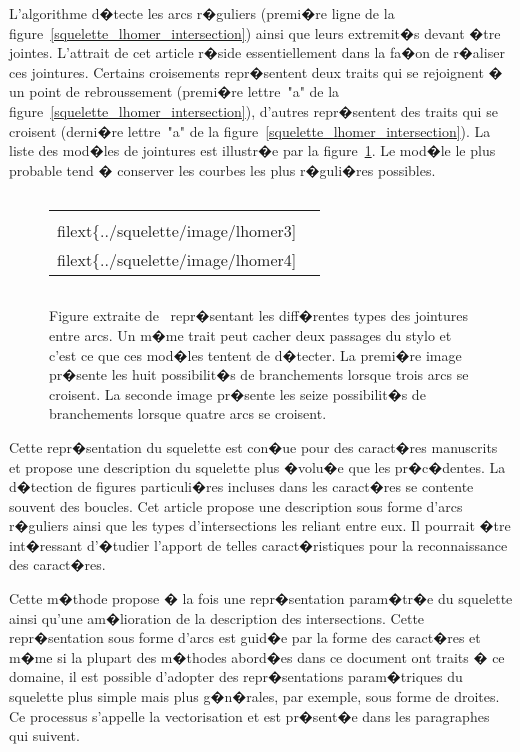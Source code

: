 
L'algorithme d�tecte les arcs r�guliers (premi�re ligne de la figure~\ref{squelette_lhomer_intersection}) ainsi que leurs extremit�s devant �tre jointes. L'attrait de cet article r�side essentiellement dans la fa�on de r�aliser ces jointures. Certains croisements repr�sentent deux traits qui se rejoignent � un point de rebroussement (premi�re lettre~"a" de la figure~\ref{squelette_lhomer_intersection}), d'autres repr�sentent des traits qui se croisent (derni�re lettre~"a" de la figure~\ref{squelette_lhomer_intersection}). La liste des mod�les de jointures est illustr�e par la figure~\ref{squelette_lhomer_intersection_modele}. Le mod�le le plus probable tend � conserver les courbes les plus r�guli�res possibles.


            \begin{figure}[ht]
        $$\begin{tabular}{|c|c|} \hline
        \texttt{[image: \\filext\{../squelette/image/lhomer3]}} &
        \texttt{[image: \\filext\{../squelette/image/lhomer4]}} 
        \\ \hline \end{tabular}$$
        \caption{    Figure extraite de~ repr�sentant les diff�rentes 
                            types des jointures entre arcs.
                            Un m�me trait peut cacher deux passages du stylo et c'est ce que ces mod�les tentent de d�tecter.    
                            La premi�re image pr�sente les huit possibilit�s de branchements lorsque trois arcs se croisent. 
                            La seconde image pr�sente les seize possibilit�s de branchements lorsque quatre arcs se croisent.}
        \label{squelette_lhomer_intersection_modele}
            \end{figure}


Cette repr�sentation du squelette est con�ue pour des caract�res manuscrits et propose une description du squelette plus �volu�e que les pr�c�dentes. La d�tection de figures particuli�res incluses dans les caract�res se contente souvent des boucles. Cet article propose une description sous forme d'arcs r�guliers ainsi que les types d'intersections les reliant entre eux. Il pourrait �tre int�ressant d'�tudier l'apport de telles caract�ristiques pour la reconnaissance des caract�res.

Cette m�thode propose � la fois une repr�sentation param�tr�e du squelette ainsi qu'une am�lioration de la description des intersections. Cette repr�sentation sous forme d'arcs est guid�e par la forme des caract�res et m�me si la plupart des m�thodes abord�es dans ce document ont traits � ce domaine, il est possible d'adopter des repr�sentations param�triques du squelette plus simple mais plus g�n�rales, par exemple, sous forme de droites. Ce processus s'appelle la vectorisation et est pr�sent�e dans les paragraphes qui suivent.










